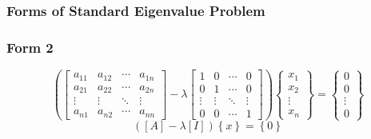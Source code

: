\documentclass[fleqn]{beamer} %
\newcommand{\sectionIIsubsectionItitle}{Forms of Standard Eigenvalue Problem}
\begin{document}
			\begin{frame}[label=sectionIIsubsectionI]
				\frametitle{\sectionIIsubsectionItitle} \small
				\bigskip

 \frametitle{Form 2}
  \begin{displaymath}
    \left( \left[ \begin{array}{cccc}
          a_{11} & a_{12} & \cdots & a_{1n} \\
          a_{21} & a_{22} & \cdots & a_{2n} \\
          \vdots & \vdots & \ddots & \vdots \\
          a_{n1} & a_{n2} & \cdots & a_{nn}
        \end{array} \right] -
      \lambda \left[ \begin{array}{cccc}
          1 & 0 & \cdots & 0 \\
          0 & 1 & \cdots & 0 \\
          \vdots & \vdots & \ddots & \vdots \\
          0 & 0 & \cdots & 1
        \end{array} \right] \right)
    \left\{ \begin{array}{c}
        x_1 \\
        x_2 \\
        \vdots \\
        x_n
      \end{array} \right\} =
    \left\{ \begin{array}{c}
        0 \\
        0 \\
        \vdots \\
        0
      \end{array} \right\}
  \end{displaymath}
  \begin{displaymath}
    \left( \left[A\right] - \lambda \left[ I \right] \right) \left\{ x \right\} = \left\{ 0 \right\}
  \end{displaymath}

				
				\btVFill
			\end{frame}
\end{document}
